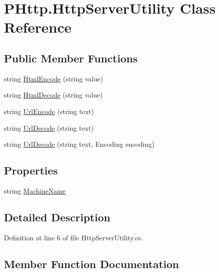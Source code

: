 \hypertarget{class_p_http_1_1_http_server_utility}{}\section{P\+Http.\+Http\+Server\+Utility Class Reference}
\label{class_p_http_1_1_http_server_utility}
\subsection*{Public Member Functions}
\begin{DoxyCompactItemize}
\item 
string \hyperlink{class_p_http_1_1_http_server_utility_a733ed2ef78dd3eb9ae35f4881567c9b1}{Html\+Encode} (string value)
\item 
string \hyperlink{class_p_http_1_1_http_server_utility_a168ab9073e93df55d7114a4873ab4014}{Html\+Decode} (string value)
\item 
string \hyperlink{class_p_http_1_1_http_server_utility_a3dc95ce0e7f8aa04311c9fe26fc25796}{Url\+Encode} (string text)
\item 
string \hyperlink{class_p_http_1_1_http_server_utility_aeda44a482b61e231671d0ac340cfc089}{Url\+Decode} (string text)
\item 
string \hyperlink{class_p_http_1_1_http_server_utility_a535284c52530af95a24d73b0a3566fe6}{Url\+Decode} (string text, Encoding encoding)
\end{DoxyCompactItemize}
\subsection*{Properties}
\begin{DoxyCompactItemize}
\item 
string \hyperlink{class_p_http_1_1_http_server_utility_a8566ef755cea24e986e9aaa16a02ade0}{Machine\+Name}
\end{DoxyCompactItemize}


\subsection{Detailed Description}


Definition at line 6 of file Http\+Server\+Utility.\+cs.



\subsection{Member Function Documentation}
\mbox{\label{class_p_http_1_1_http_server_utility_a168ab9073e93df55d7114a4873ab4014}} 
